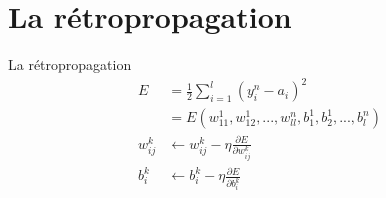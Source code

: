\documentclass[ignorenonframetext,]{beamer}
\begin{document}
\section{La rétropropagation}

\begin{frame}{La rétropropagation}
	\begin{align*}
		E &= \frac{1}{2} \sum_{i=1}^l (y_i^n-a_i)^2 \\
		&= E(w_{11}^1, w_{12}^1, ..., w_{ll}^n, b_1^1, b_2^1, ..., b_l^n) \\
		w_{ij}^k &\longleftarrow w_{ij}^k - \eta \frac{\partial{E}}{\partial{w_{ij}^k}} \\
		b_i^k &\longleftarrow b_i^k - \eta \frac{\partial{E}}{\partial{b_i^k}}
	\end{align*}
\end{frame}
\end{document}
